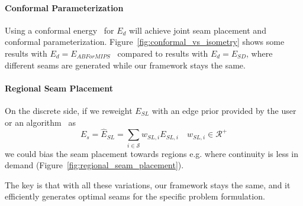\paragraph{Conformal Parameterization} \minchen{[TODO]} Using a conformal energy~\cite{Hormann2000MIPS,Sheffer2005ABFPP} for $E_d$ will achieve joint seam placement and conformal parameterization. Figure~\ref{fig:conformal_vs_isometry} shows some results with $E_d = E_{ABForMIPS}$~\cite{} compared to results with $E_d = E_{SD}$, where different seams are generated while our framework stays the same.

\paragraph{Regional Seam Placement} \minchen{[TODO]} On the discrete side, if we reweight $E_{SL}$ with an edge prior provided by the user or an algorithm~\cite{} as
\[ E_s = \hat{E}_{SL} = \sum_{i\in\mathcal{S}} w_{SL,i} E_{SL,i} \quad w_{SL,i} \in \mathcal{R^+} \]
we could bias the seam placement towards regions e.g. where continuity is less in demand (Figure~\ref{fig:regional_seam_placement}).


The key is that with all these variations, our framework stays the same, and it efficiently generates optimal seams for the specific problem formulation.